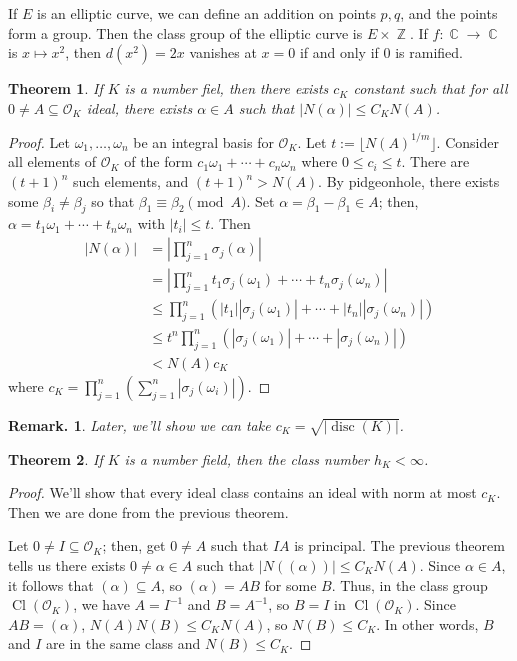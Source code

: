 \documentclass[11pt, a4paper]{memoir}
\DeclareMathOperator{\Z}{{\mathbb{Z}}}
\DeclareMathOperator{\C}{{\mathbb{C}}}
\theoremstyle{change}
\newtheorem{theorem}{Theorem}[section]
\theoremstyle{plain}
\theoremstyle{nonumberplain}
\newtheorem{remark}{Remark.}
\newtheorem{proof}{Proof}
\DeclareMathOperator{\disc}{disc}
\DeclareMathOperator{\Cl}{Cl}
\begin{document}
If $E$ is an elliptic curve, we can define an addition on points $p,q$, and the points form a group.
Then the class group of the elliptic curve is $E\times\Z$.
If $f:\C\to\C$ is $x\mapsto x^2$, then $d(x^2)=2x$ vanishes at $x=0$ if and only if $0$ is ramified.
\begin{theorem}
    If $K$ is a number fiel, then there exists $c_K$ constant such that for all $0\neq A\subseteq\mathcal{O}_K$ ideal, there exists $\alpha\in A$ such that $|N(\alpha)|\leq C_KN(A)$.
\end{theorem}
\begin{proof}
    Let $\omega_1,\ldots,\omega_n$ be an integral basis for $\mathcal{O}_K$.
    Let $t:=\lfloor N(A)^{1/m}\rfloor$.
    Consider all elements of $\mathcal{O}_K$ of the form $c_1\omega_1+\cdots+c_n\omega_n$ where $0\leq c_i\leq t$.
    There are $(t+1)^n$ such elements, and $(t+1)^n>N(A)$.
    By pidgeonhole, there exists some $\beta_i\neq\beta_j$ so that $\beta_1\equiv\beta_2\pmod{A}$.
    Set $\alpha=\beta_1-\beta_1\in A$; then, $\alpha=t_1\omega_1+\cdots+t_n\omega_n$ with $|t_i|\leq t$.
    Then
    \begin{align*}
        |N(\alpha)| &= \left\lvert\prod_{j=1}^n\sigma_j(\alpha)\right\rvert\\
                    &= \left\lvert\prod_{j=1}^nt_1\sigma_j(\omega_1)+\cdots+t_n\sigma_j(\omega_n)\right\rvert\\
                    &\leq \prod_{j=1}^n\left(|t_1||\sigma_j(\omega_1)|+\cdots+|t_n||\sigma_j(\omega_n)|\right)\\
                    &\leq t^n\prod_{j=1}^n(|\sigma_j(\omega_1)|+\cdots+|\sigma_j(\omega_n)|)\\
                    &<N(A)c_K
    \end{align*}
    where $c_K=\prod_{j=1}^n\left(\sum_{j=1}^n|\sigma_j(\omega_i)|\right)$.
\end{proof}
\begin{remark}
    Later, we'll show we can take $c_K=\sqrt{|\disc(K)|}$.
\end{remark}
\begin{theorem}
    If $K$ is a number field, then the class number $h_K<\infty$.
\end{theorem}
\begin{proof}
    We'll show that every ideal class contains an ideal with norm at most $c_K$.
    Then we are done from the previous theorem.

    Let $0\neq I\subseteq\mathcal{O}_K$; then, get $0\neq A$ such that $IA$ is principal.
    The previous theorem tells us there exists $0\neq\alpha\in A$ such that $|N((\alpha))|\leq C_KN(A)$.
    Since $\alpha\in A$, it follows that $(\alpha)\subseteq A$, so $(\alpha)=AB$ for some $B$.
    Thus, in the class group $\Cl(\mathcal{O}_K)$, we have $A=I^{-1}$ and $B=A^{-1}$, so $B=I$ in $\Cl(\mathcal{O}_K)$.
    Since $AB=(\alpha)$, $N(A)N(B)\leq C_KN(A)$, so $N(B)\leq C_K$.
    In other words, $B$ and $I$ are in the same class and $N(B)\leq C_K$.
\end{proof}
\end{document}
